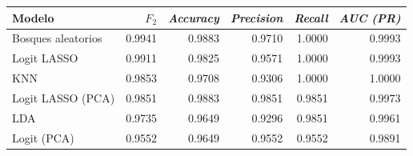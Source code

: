\begin{tabular*}{\textwidth}{@{\extracolsep{\fill}}lrrrrr}
\toprule
  Modelo & $F_2$ & \textit{Accuracy} & \textit{Precision} & \textit{Recall} & \textit{AUC (PR)}\\
\midrule
Bosques aleatorios & 0.9941 & 0.9883 & 0.9710 & 1.0000 & 0.9993\\
Logit LASSO & 0.9911 & 0.9825 & 0.9571 & 1.0000 & 0.9993\\
KNN & 0.9853 & 0.9708 & 0.9306 & 1.0000 & 1.0000\\
Logit LASSO (PCA) & 0.9851 & 0.9883 & 0.9851 & 0.9851 & 0.9973\\
LDA & 0.9735 & 0.9649 & 0.9296 & 0.9851 & 0.9961\\
Logit (PCA) & 0.9552 & 0.9649 & 0.9552 & 0.9552 & 0.9891\\
\bottomrule
\end{tabular*}
